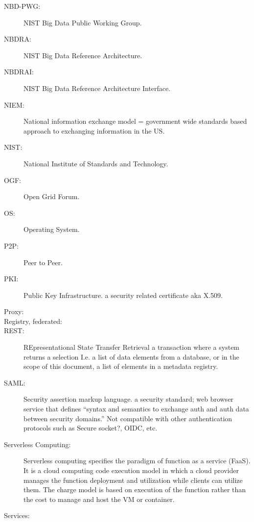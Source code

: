 \begin{description}
\item[NBD-PWG:]	NIST Big Data Public Working Group.

\item[NBDRA:]	NIST Big Data Reference Architecture.

\item[NBDRAI:]	NIST Big Data Reference Architecture Interface.

\item[NIEM:] 	National information exchange model = government wide standards based approach to exchanging information in the US. 

\item[NIST:]	National Institute of Standards and Technology.

\item[OGF:]	   Open Grid Forum. 

\item[OS:]	Operating System.

\item[P2P:] Peer to Peer.

\item[PKI:]    Public Key Infrastructure. a security related certificate aka X.509. 

\item[Proxy:]	

\item[Registry, federated:]


\item[REST:]	REpresentational State Transfer
Retrieval 	a transaction where a system returns a selection I.e. a list of data elements from a database, or in the scope of this document, a list of elements in a metadata registry. 

\item[SAML:]   Security assertion markup language. a security standard; web browser service that defines “syntax and semantics to exchange auth and auth data between security domains.” Not compatible with other authentication protocols such as Secure socket?, OIDC, etc.

\item[Serverless Computing:]	Serverless computing specifies the paradigm of function as a service (FaaS). It is a cloud computing code execution model in which a cloud provider manages the function deployment and utilization while clients can utilize them. The charge model is based on execution of the function rather than the cost to manage and host the VM or container.

\item[Services:] 


\end{description}
